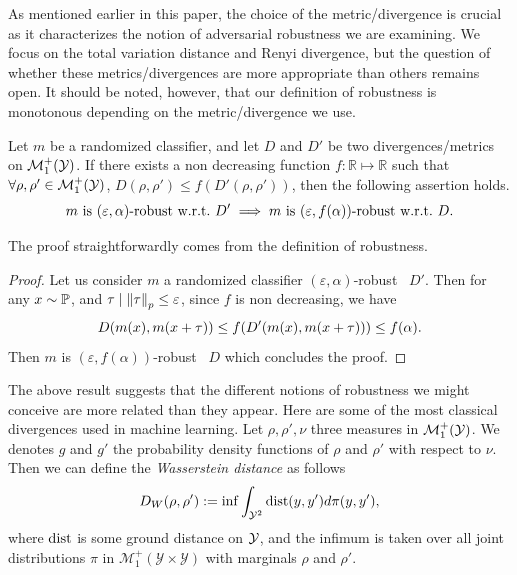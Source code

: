 As mentioned earlier in this paper, the choice of the metric/divergence is crucial as it characterizes the notion of adversarial robustness we are examining. We focus on the total variation distance and Renyi divergence, but the question of whether these metrics/divergences are more appropriate than others remains open. It should be noted, however, that our definition of robustness is monotonous depending on the metric/divergence we use.

\begin{prop}
\label{th::PropimpliesRobustness}
Let $m $ be a randomized classifier, and let  $D$ and $D'$ be two divergences/metrics on $\mathcal{M}^+_1(\mathcal{Y})$.
If there exists a non decreasing function $ f: \mathbb{R} \mapsto \mathbb{R}$ such that  $\forall \rho ,\rho' \in \mathcal{M}^+_1(\mathcal{Y})$, $D(\rho  , \rho') \leq f(D'(\rho  , \rho')) $, then the following assertion holds. 
$$m  \text{ is } (\varepsilon, \alpha)\textnormal{-robust \wrt~}D' \implies m  \text{ is } (\varepsilon, f(\alpha))\text{-robust \wrt~} D.$$
\end{prop}
 The proof straightforwardly comes from the definition of robustness.
\begin{proof}
Let us consider $m $ a randomized classifier $(\varepsilon, \alpha)$-robust \wrt~$ D'$. Then for any $x  \sim \mathbb{P}$, and ${\tau}\mid \norm{{\tau}}_p \leq \varepsilon$, since $f$ is non decreasing, we have $$D(m (x ),m (x  +\perturb)) \leq f\left(D'(m (x ),m (x  +\perturb))\right) \leq f\left(\alpha\right).$$ 
Then $m $ is  $(\varepsilon, f(\alpha))$-robust \wrt~$D$ which concludes the proof.
\end{proof}

The above result suggests that the different notions of robustness we might conceive are more related than they appear. Here are some of the most classical divergences used in machine learning. Let $\rho,\rho',\nu$ three measures in $\mathcal{M}^+_1(\mathcal{Y})$. We denotes $g$ and $g'$ the probability density functions of $\rho$ and $\rho'$ with respect to $\nu$. Then we can define the \emph{Wasserstein distance} as follows 
\begin{equation}
        D_{W}(\rho  , \rho' ) := \inf\int_{\mathcal{Y}^{2}} \dist\left( y, y'\right) d\pi(y,y'),
\end{equation}
where $\operatorname{dist}$ is some ground distance on $\mathcal{Y}$, and the infimum is taken over all joint distributions $\pi$ in $\mathcal{M}^+_1\left( \mathcal{Y}\times\mathcal{Y} \right)$ with marginals $\rho$ and $\rho'$.  

